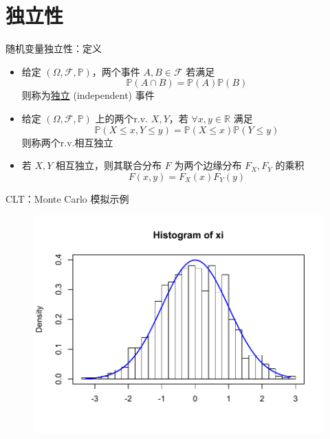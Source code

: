 \documentclass[notheorems,handout]{beamer}
\theoremstyle{mydefstyle}\newtheorem{definition}{定义}
\theoremstyle{mydefstyle}\newtheorem*{assumption}{假设}
\theoremstyle{mythmstyle}\newtheorem{theorem}{定理}
\theoremstyle{mythmstyle}\newtheorem{proposition}{命题}
\theoremstyle{mythmstyle}\newtheorem{lemma}{引理}
\theoremstyle{myrmkstyle}\newtheorem*{remark}{注}
\renewcommand{\P}{\mathbb{P}}
\newcommand{\F}{\mathcal{F}}
\newcommand{\R}{\mathbb{R}}
\begin{document}
\section{独立性}
\begin{frame}{随机变量独立性：定义}
\begin{itemize}
\item
给定 $(\Omega,\F,\P)$，两个事件 $A,B\in\F$ 若满足 
$$
\P(A\cap B) = \P(A)\P(B)
$$
则称为\underline{独立} (independent) 事件
\item
给定 $(\Omega,\F,\P)$ 上的两个r.v. $X,Y$，若 $\forall x,y\in\R$ 满足
$$
\P(X\le x, Y\le y) = \P(X\le x)\P(Y\le y)
$$
则称两个r.v.相互独立
\item
若 $X,Y$ 相互独立，则其联合分布 $F$ 为两个边缘分布 $F_X,F_Y$ 的乘积
$$
F(x,y) = F_X(x)F_Y(y)
$$
\end{itemize}
\end{frame}

\begin{frame}{CLT：Monte Carlo 模拟示例}
\begin{figure}
\includegraphics[width=1\textwidth]{CLT.pdf}
\end{figure}
\end{frame}
\end{document}
